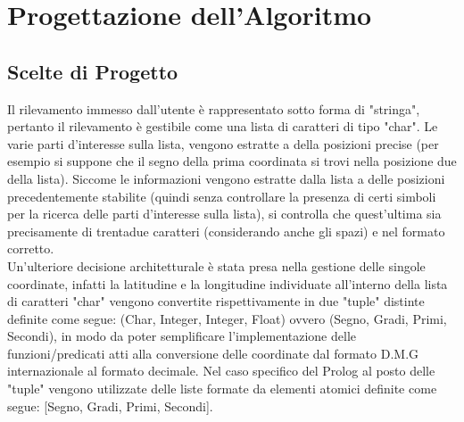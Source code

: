 \documentclass{article}
\begin{document}
\section{Progettazione dell'Algoritmo}
\subsection{Scelte di Progetto}
Il rilevamento immesso dall'utente è rappresentato sotto forma di "stringa", pertanto il rilevamento è gestibile come una lista di caratteri di tipo "char". Le varie parti d'interesse sulla lista, vengono estratte a della posizioni precise (per esempio si suppone che il segno della prima coordinata si trovi nella posizione due della lista).  Siccome le informazioni vengono estratte dalla lista a delle posizioni precedentemente stabilite (quindi senza controllare la presenza di certi simboli per la ricerca delle parti d'interesse sulla lista), si controlla che quest'ultima sia precisamente di trentadue caratteri (considerando anche gli spazi) e nel formato corretto.\\
 Un'ulteriore decisione architetturale è stata presa nella gestione delle singole coordinate, infatti la latitudine e la longitudine individuate all'interno della lista di caratteri "char" vengono convertite rispettivamente in due "tuple" distinte definite come segue: (Char, Integer, Integer, Float) ovvero (Segno, Gradi, Primi, Secondi), in modo da poter semplificare l'implementazione delle funzioni/predicati atti alla conversione delle coordinate dal formato D.M.G internazionale al formato decimale. Nel caso specifico del Prolog al posto delle "tuple" vengono utilizzate delle liste formate da elementi atomici definite come segue:  [Segno, Gradi, Primi, Secondi].
 
\end{document}
